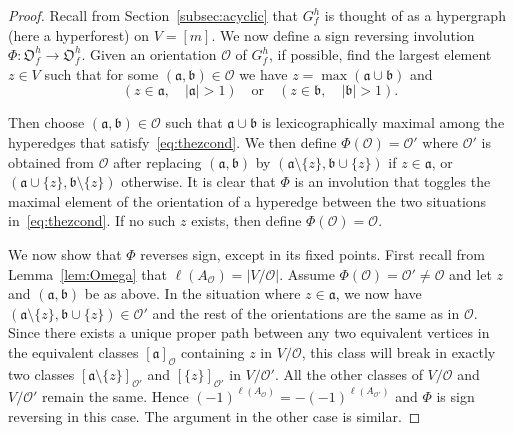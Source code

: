 \documentclass[ALCO,ThmDefs,Unicode,epreuves]{cedram}
\begin{document}
\begin{exam}
\begin{proof}
Recall from Section~\ref{subsec:acyclic} that $G_f^h$ is thought of as a hypergraph (here a hyperforest) on $V=[m]$.
We now define 
a sign reversing involution $\Phi\colon \mathfrak{O}_f^h\to \mathfrak{O}_f^h$. 
Given an orientation $\mathcal{O}$ of $G_f^h$, 
if possible, find the largest element $z\in V$ such that for some $(\mathfrak{a},\mathfrak{b})\in \mathcal{O}$ we have $z=\max(\mathfrak{a}\cup \mathfrak{b})$ and
\begin{equation}\label{eq:thezcond}
 ( z\in \mathfrak{a}, \quad |\mathfrak{a}|>1 )\quad \text{or} \quad ( z\in \mathfrak{b}, \quad |\mathfrak{b}|>1 ).
 \end{equation}

Then choose $(\mathfrak{a},\mathfrak{b})\in \mathcal{O}$ such that $\mathfrak{a}\cup\mathfrak{b}$ is lexicographically maximal among the hyperedges that satisfy~\eqref{eq:thezcond}. We then define $\Phi(\mathcal{O})=\mathcal{O}'$ where $\mathcal{O}'$ is obtained from $\mathcal{O}$
after replacing $(\mathfrak{a},\mathfrak{b})$ by $(\mathfrak{a}\setminus\{z\},\mathfrak{b}\cup\{z\})$ if $z\in \mathfrak{a}$, or $(\mathfrak{a}\cup\{z\},\mathfrak{b}\setminus\{z\})$ otherwise. It is clear that $\Phi$ is an involution that toggles the maximal element of the orientation of a hyperedge between the two situations in~\eqref{eq:thezcond}. If no such $z$ exists, then define $\Phi(\mathcal{O})=\mathcal{O}$. 

We now show that $\Phi$ reverses sign, except in its fixed points. First recall from Lemma~\ref{lem:Omega} that $\ell(A_{\mathcal{O}})=|V/\mathcal{O}|$.
Assume $\Phi(\mathcal{O})=\mathcal{O}'\ne \mathcal{O}$ and let $z$ and $(\mathfrak{a},\mathfrak{b})$ be as above. 
In the situation where $z\in \mathfrak{a}$, we now have $(\mathfrak{a}\setminus\{z\},\mathfrak{b}\cup\{z\})\in\mathcal{O}'$ and the rest of the orientations are the same as in $\mathcal{O}$.
Since there exists a unique proper path between any two equivalent vertices in the 
 equivalent classes $[\mathfrak{a}]_{\mathcal{O}}$ containing $z$ in $V/\mathcal{O}$, this class will break in exactly two classes $[\mathfrak{a}\setminus \{z\}]_{\mathcal{O}'}$ and 
$[\{z\}]_{\mathcal{O}'}$ in $V/\mathcal{O}'$. All the other classes of $V/\mathcal{O}$ and $V/\mathcal{O}'$ remain the same. Hence $(-1)^{\ell(A_{\mathcal{O}})}=-(-1)^{\ell(A_{\mathcal{O}'})}$
and $\Phi$ is sign reversing in this case. The argument in the other case is similar.


\end{proof}
\end{exam}
\end{document}
